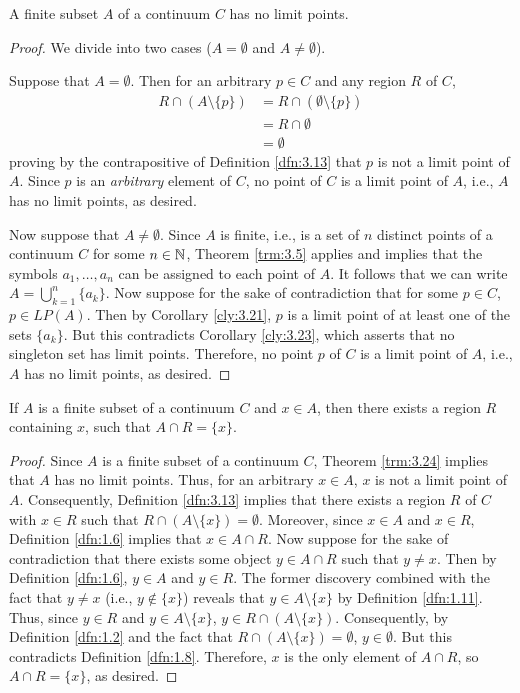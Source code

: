 \documentclass[../main.tex]{subfiles}
\begin{document}
\begin{theorem}\label{trm:3.24}
    A finite subset $A$ of a continuum $C$ has no limit points.
    \begin{proof}
        We divide into two cases ($A=\emptyset$ and $A\neq\emptyset$).\par
        Suppose that $A=\emptyset$. Then for an arbitrary $p\in C$ and any region $R$ of $C$,
        \begin{align*}
            R\cap(A\setminus\{p\}) &= R\cap(\emptyset\setminus\{p\})\\
            &= R\cap\emptyset\\
            &= \emptyset
        \end{align*}
        proving by the contrapositive of Definition \ref{dfn:3.13} that $p$ is not a limit point of $A$. Since $p$ is an \emph{arbitrary} element of $C$, no point of $C$ is a limit point of $A$, i.e., $A$ has no limit points, as desired.\par
        Now suppose that $A\neq\emptyset$. Since $A$ is finite, i.e., is a set of $n$ distinct points of a continuum $C$ for some $n\in\mathbb{N}$, Theorem \ref{trm:3.5} applies and implies that the symbols $a_1,\dots,a_n$ can be assigned to each point of $A$. It follows that we can write $A=\bigcup_{k=1}^n\{a_k\}$. Now suppose for the sake of contradiction that for some $p\in C$, $p\in LP(A)$. Then by Corollary \ref{cly:3.21}, $p$ is a limit point of at least one of the sets $\{a_k\}$. But this contradicts Corollary \ref{cly:3.23}, which asserts that no singleton set has limit points. Therefore, no point $p$ of $C$ is a limit point of $A$, i.e., $A$ has no limit points, as desired.
    \end{proof}
\end{theorem}

\begin{corollary}\label{cly:3.25}
    If $A$ is a finite subset of a continuum $C$ and $x\in A$, then there exists a region $R$ containing $x$, such that $A\cap R=\{x\}$.
    \begin{proof}
        Since $A$ is a finite subset of a continuum $C$, Theorem \ref{trm:3.24} implies that $A$ has no limit points. Thus, for an arbitrary $x\in A$, $x$ is not a limit point of $A$. Consequently, Definition \ref{dfn:3.13} implies that there exists a region $R$ of $C$ with $x\in R$ such that $R\cap(A\setminus\{x\})=\emptyset$. Moreover, since $x\in A$ and $x\in R$, Definition \ref{dfn:1.6} implies that $x\in A\cap R$. Now suppose for the sake of contradiction that there exists some object $y\in A\cap R$ such that $y\neq x$. Then by Definition \ref{dfn:1.6}, $y\in A$ and $y\in R$. The former discovery combined with the fact that $y\neq x$ (i.e., $y\notin\{x\}$) reveals that $y\in A\setminus\{x\}$ by Definition \ref{dfn:1.11}. Thus, since $y\in R$ and $y\in A\setminus\{x\}$, $y\in R\cap(A\setminus\{x\})$. Consequently, by Definition \ref{dfn:1.2} and the fact that $R\cap(A\setminus\{x\})=\emptyset$, $y\in\emptyset$. But this contradicts Definition \ref{dfn:1.8}. Therefore, $x$ is the only element of $A\cap R$, so $A\cap R=\{x\}$, as desired.
    \end{proof}
\end{corollary}
\end{document}
